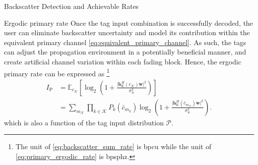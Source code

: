 \documentclass[journal]{IEEEtran}
\begin{document}
\begin{section}{Backscatter Detection and Achievable Rates}
		\begin{subsection}{Ergodic primary rate}
			Once the tag input combination is successfully decoded, the user can eliminate backscatter uncertainty and model its contribution within the equivalent primary channel \eqref{eq:equivalent_primary_channel}. As such, the tags can adjust the propagation environment in a potentially beneficial manner, and create artificial channel variation within each fading block. Hence, the ergodic primary rate can be expressed as \footnote{The unit of \eqref{eq:backscatter_sum_rate} is \gls{bpcu} while the unit of \eqref{eq:primary_ergodic_rate} is \gls{bpsphz}.}
			\begin{align}
				I_{\mathrm{P}}
				& = \mathbb{E}_{c_{\mathcal{K}}} \left[\log_2 \left(1 + \frac{\lvert \boldsymbol{h}_{\mathrm{E}}^H(c_{\mathcal{K}}) \boldsymbol{w} \rvert^2}{\sigma_w^2}\right)\right]\nonumber\\
				& = \sum_{m_{\mathcal{K}}} \prod_{k \in \mathcal{K}} P_k(\bar{c}_{m_k}) \log_2 \left(1 + \frac{\lvert \boldsymbol{h}_{\mathrm{E}}^H(\bar{c}_{m_{\mathcal{K}}}) \boldsymbol{w} \rvert^2}{\sigma_w^2}\right).
				\label{eq:primary_ergodic_rate}
			\end{align}
			which is also a function of the tag input distribution $\mathcal{P}$.
		\end{subsection}
	\end{section}
\end{document}
